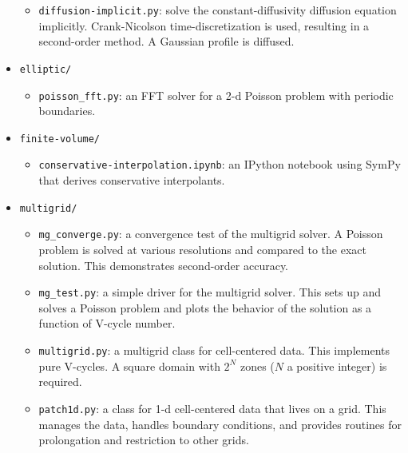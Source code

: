 \begin{itemize}
\begin{itemize}
    \item {\tt diffusion-implicit.py}: solve the constant-diffusivity
      diffusion equation implicitly.  Crank-Nicolson time-discretization
      is used, resulting in a second-order method.  A Gaussian profile
      is diffused.

  \end{itemize}
  
\item {\tt elliptic/}

  \begin{itemize}
    \item {\tt poisson\_fft.py}: an FFT solver for a 2-d Poisson problem
    with periodic boundaries.
  \end{itemize}

\item {\tt finite-volume/}

  \begin{itemize}
  \item {\tt conservative-interpolation.ipynb}: an {\sf IPython} notebook
    using {\sf SymPy} that derives conservative interpolants.
  \end{itemize}

\item {\tt multigrid/}

  \begin{itemize}
  \item {\tt mg\_converge.py}: a convergence test of the multigrid
    solver.  A Poisson problem is solved at various resolutions and
    compared to the exact solution.  This demonstrates second-order
    accuracy.

  \item {\tt mg\_test.py}: a simple driver for the multigrid solver.
    This sets up and solves a Poisson problem and plots the behavior 
    of the solution as a function of V-cycle number.

  \item{\tt multigrid.py}: a multigrid class for cell-centered data.
    This implements pure V-cycles.  A square domain with $2^N$ zones
    ($N$ a positive integer) is required.

  \item {\tt patch1d.py}: a class for 1-d cell-centered data that
    lives on a grid.  This manages the data, handles boundary
    conditions, and provides routines for prolongation and restriction
    to other grids.

  \end{itemize}


\end{itemize}
